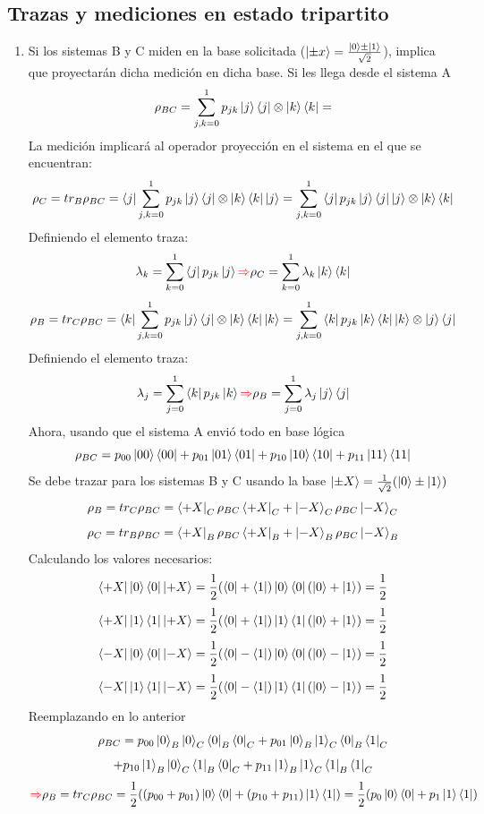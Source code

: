 \documentclass{book}
\begin{document}
\subsection{Trazas y mediciones en estado tripartito}
\begin{enumerate}
    \item Si los sistemas B y C miden en la base solicitada ($\ket{\pm x}=\frac{\ket{0}\pm\ket{1}}{\sqrt{2}}$), implica que proyectarán dicha medición en dicha base. Si les llega desde el sistema A
    $$\rho_{BC}=\sum_{j,k=0}^1 p_{jk}\ket{j}\bra{j}\otimes\ket{k}\bra{k}=$$
    La medición implicará al operador proyección en el sistema en el que se encuentran:
    $$ \rho_C=tr_B\rho_{BC}=\bra{j}\sum_{j,k=0}^1 p_{jk}\ket{j}\bra{j}\otimes\ket{k}\bra{k}\ket{j}=\sum_{j,k=0}^1 \bra{j}p_{jk}\ket{j}\bra{j}\ket{j}\otimes\ket{k}\bra{k}$$
    Definiendo el elemento traza:
    $$ \lambda_k=\sum_{k=0}^1\bra{j}p_{jk}\ket{j}\textcolor{red}{\Rightarrow} \rho_C=\sum_{k=0}^1 \lambda_k \ket{k}\bra{k}$$ 
    $$ \rho_B=tr_C\rho_{BC}=\bra{k}\sum_{j,k=0}^1 p_{jk}\ket{j}\bra{j}\otimes\ket{k}\bra{k}\ket{k}=\sum_{j,k=0}^1 \bra{k}p_{jk}\ket{k}\bra{k}\ket{k}\otimes \ket{j}\bra{j}$$
    Definiendo el elemento traza:
    $$ \lambda_j=\sum_{j=0}^1\bra{k}p_{jk}\ket{k}\textcolor{red}{\Rightarrow} \rho_B=\sum_{j=0}^1 \lambda_j \ket{j}\bra{j}$$ 
    Ahora, usando que el sistema A envió todo en base lógica
    $$ \rho_{BC}=p_{00}\ket{00}\bra{00}+p_{01}\ket{01}\bra{01}+p_{10}\ket{10}\bra{10}+p_{11}\ket{11}\bra{11}$$
    Se debe trazar para los sistemas B y C usando la base $\ket{\pm X}=\frac{1}{\sqrt{2}}(\ket{0}\pm\ket{1})$
    $$ \rho_B=tr_C\rho_{BC}=\bra{+X}_C\rho_{BC}\bra{+X}_C+\ket{-X}_C\rho_{BC}\ket{-X}_C$$
    $$ \rho_C=tr_B\rho_{BC}=\bra{+X}_B\rho_{BC}\bra{+X}_B+\ket{-X}_B\rho_{BC}\ket{-X}_B$$
    Calculando los valores necesarios:
    $$ \bra{+X}\ket{0}\bra{0}\ket{+X}= \frac{1}{2}(\bra{0}+\bra{1})\ket{0}\bra{0}(\ket{0}+\ket{1})=\frac{1}{2}$$
    $$ \bra{+X}\ket{1}\bra{1}\ket{+X}= \frac{1}{2}(\bra{0}+\bra{1})\ket{1}\bra{1}(\ket{0}+\ket{1})=\frac{1}{2}$$
    $$ \bra{-X}\ket{0}\bra{0}\ket{-X}= \frac{1}{2}(\bra{0}-\bra{1})\ket{0}\bra{0}(\ket{0}-\ket{1})=\frac{1}{2}$$
    $$ \bra{-X}\ket{1}\bra{1}\ket{-X}= \frac{1}{2}(\bra{0}-\bra{1})\ket{1}\bra{1}(\ket{0}-\ket{1})=\frac{1}{2}$$
    Reemplazando en lo anterior
    $$ \rho_{BC}=p_{00}\ket{0}_B\ket{0}_C\bra{0}_B\bra{0}_C+p_{01}\ket{0}_B\ket{1}_C\bra{0}_B\bra{1}_C $$ $$+p_{10}\ket{1}_B\ket{0}_C\bra{1}_B\bra{0}_C+p_{11}\ket{1}_B\ket{1}_C\bra{1}_B\bra{1}_C$$
    $$\textcolor{red}{\Rightarrow}\rho_B=tr_C\rho_{BC}=\frac{1}{2}((p_{00}+p_{01})\ket{0}\bra{0}+(p_{10}+p_{11})\ket{1}\bra{1})=\frac{1}{2}(p_0\ket{0}\bra{0}+p_1\ket{1}\bra{1})$$

\end{enumerate}
\end{document}
